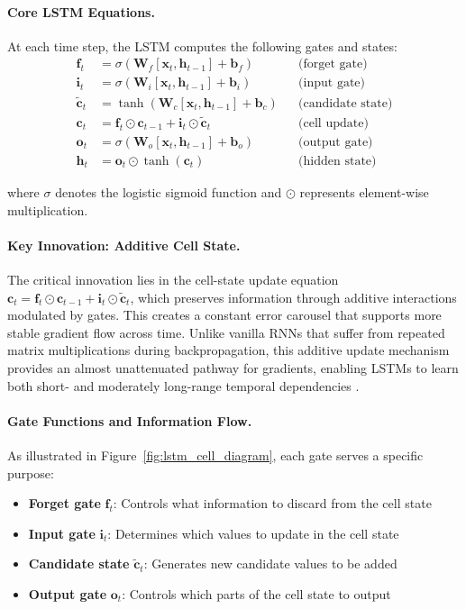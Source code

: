 \paragraph{Core LSTM Equations.} At each time step, the LSTM computes the following gates and states:
\begin{align}
\mathbf{f}_t &= \sigma(\mathbf{W}_f [\mathbf{x}_t, \mathbf{h}_{t-1}] + \mathbf{b}_f) &&\text{(forget gate)}\\
\mathbf{i}_t &= \sigma(\mathbf{W}_i [\mathbf{x}_t, \mathbf{h}_{t-1}] + \mathbf{b}_i) &&\text{(input gate)}\\
\tilde{\mathbf{c}}_t &= \tanh(\mathbf{W}_c [\mathbf{x}_t, \mathbf{h}_{t-1}] + \mathbf{b}_c) &&\text{(candidate state)}\\
\mathbf{c}_t &= \mathbf{f}_t \odot \mathbf{c}_{t-1} + \mathbf{i}_t \odot \tilde{\mathbf{c}}_t &&\text{(cell update)}\\
\mathbf{o}_t &= \sigma(\mathbf{W}_o [\mathbf{x}_t, \mathbf{h}_{t-1}] + \mathbf{b}_o) &&\text{(output gate)}\\
\mathbf{h}_t &= \mathbf{o}_t \odot \tanh(\mathbf{c}_t) &&\text{(hidden state)}
\end{align}

where \(\sigma\) denotes the logistic sigmoid function and \(\odot\) represents element-wise multiplication.

\paragraph{Key Innovation: Additive Cell State.} The critical innovation lies in the cell-state update equation \(\mathbf{c}_t = \mathbf{f}_t \odot \mathbf{c}_{t-1} + \mathbf{i}_t \odot \tilde{\mathbf{c}}_t\), which preserves information through additive interactions modulated by gates. This creates a constant error carousel that supports more stable gradient flow across time. Unlike vanilla RNNs that suffer from repeated matrix multiplications during backpropagation, this additive update mechanism provides an almost unattenuated pathway for gradients, enabling LSTMs to learn both short- and moderately long-range temporal dependencies \cite{hochreiter1997long}.

\paragraph{Gate Functions and Information Flow.} As illustrated in Figure~\ref{fig:lstm_cell_diagram}, each gate serves a specific purpose:
\begin{itemize}
    \item \textbf{Forget gate} \(\mathbf{f}_t\): Controls what information to discard from the cell state
    \item \textbf{Input gate} \(\mathbf{i}_t\): Determines which values to update in the cell state
    \item \textbf{Candidate state} \(\tilde{\mathbf{c}}_t\): Generates new candidate values to be added
    \item \textbf{Output gate} \(\mathbf{o}_t\): Controls which parts of the cell state to output
\end{itemize}

